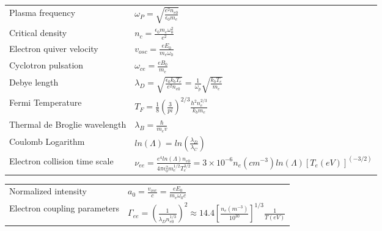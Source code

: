\noindent {}
\begin{center}
\begin{tabular}{p{7cm}p{7cm}}\toprule
Plasma frequency                 & $\omega_P = \sqrt{\frac{e^2 n_{e0}}{\epsilon_0 m_e}}$   \\[10pt]
Critical density                       & $n_c = \frac{\epsilon_0 m_e \omega_0^2}{e^2}$             \\[10pt]
Electron quiver velocity                 & $v_{osc} = \frac{e E_0}{m_e\omega_0}$      \\[10pt]
Cyclotron pulsation                          & $\omega_{ce} = \frac{eB_0}{m_e}$                    \\[10pt]                                           
Debye length                                   & $\lambda_D = \sqrt{\frac{\epsilon_0 k_b T_e}{e^2 n_{e0}}} = \frac{1}{\omega_p} \sqrt{\frac{k_b T_e}{m_e}} $                        \\[10pt]
Fermi Temperature                                  & $T_F =\frac{1}{8}(\frac{3}{pi})^{2/3}\frac{h^2n_e^{2/3}}{k_bm_e} $     \\[10pt]
Thermal de Broglie wavelength       & $\lambda_B = \frac{\hbar}{m_ev}$                          \\[10pt]
Coulomb   Logarithm                  & $ ln( \Lambda )= ln(\frac{\lambda_D}{\lambda_C})     $       \\[10pt]
Electron collision time scale               &$ \nu_{ee} = \frac{e^4 ln(\Lambda) n_{e0}}{4 \pi \epsilon_0^2 m_e^{1/2} T_e^{3/2}} =3\times 10^{-6} n_e(cm^{-3}) ln(\Lambda)[T_e(eV)]^{(-3/2)}$             \\[10pt]
\hline
\end{tabular}
\end{center}

\vspace{0.3 in}

\noindent {}
\begin{center}
\begin{tabular}{p{7cm}p{7cm}}\toprule
Normalized intensity & $a_0 = \frac{v_{osc}}{c} = \frac{e E_0}{m_e \omega_0 c}$ \\[10pt]
Electron coupling parameters & $\Gamma_{ee} = (\frac{1}{\lambda_D n_{e0}^{1/3}})^2 \approx 14.4 [\frac{n_e(m^{-3})}{10^{30}}]^{1/3}\frac{1}{T(eV)}$ \\[10pt]
\hline
\end{tabular}
\end{center}

